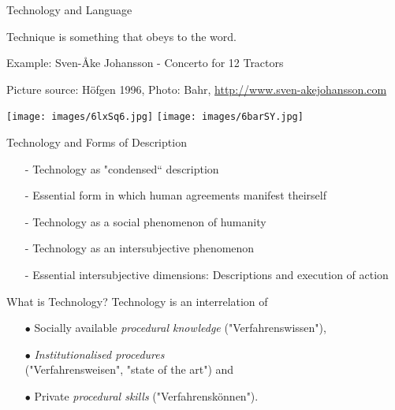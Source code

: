 \documentclass{beamer}
\begin{document}
\begin{frame}{Technology and Language}

Technique is something that obeys to the word.

Example: Sven-Åke Johansson - Concerto for 12 Tractors

Picture source: Höfgen 1996, Photo: Bahr,
\url{http://www.sven-akejohansson.com}

\begin{center}
  \texttt{[image: images/6lxSq6.jpg]}\hfill
  \texttt{[image: images/6barSY.jpg]}
\end{center}

\end{frame}

\begin{frame}{Technology and Forms of Description}
  \begin{itemize}
  \item[-] Technology as "condensed“ description
  \item[-] Essential form in which human agreements manifest theirself
  \item[-] Technology as a social phenomenon of humanity
  \item[-] Technology as an intersubjective phenomenon
  \item[-] Essential intersubjective dimensions: Descriptions and execution of
    action
  \end{itemize}
  \begin{block}{What is Technology?} 
    Technology is an interrelation of
    \begin{itemize}
    \item[$\bullet$] Socially available \emph{procedural knowledge}
      ("Verfahrenswissen"), 
    \item[$\bullet$] \emph{Institutionalised
      procedures}\\ ("Verfahrensweisen", "state of the art") and
    \item[$\bullet$] Private \emph{procedural skills} ("Verfahrenskönnen").
    \end{itemize}
  \end{block}
\end{frame}
\end{document}
